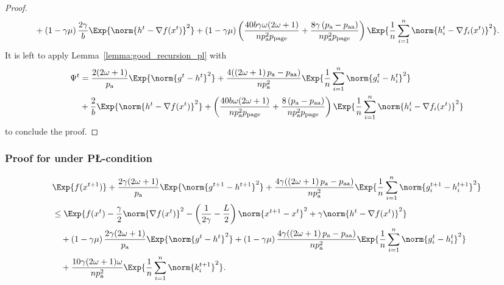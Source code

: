 \documentclass{article}
\newcommand{\algorithmname}{DASHA-PP}
\newcommand*{\probavailable}{\ensuremath{p_{\textnormal{a}}}}
\newcommand*{\probpairaa}{\ensuremath{p_{\textnormal{aa}}}}
\newcommand*{\probpage}{\ensuremath{p_{\text{page}}}}
\begin{document}
\begin{proof}
\begin{align*}
      &\quad + \left(1 - \gamma \mu\right)\frac{2\gamma}{b}\Exp{\norm{h^{t} - \nabla f(x^{t})}^2} + \left(1 - \gamma \mu\right)\left(\frac{40 b \gamma \omega (2 \omega + 1)}{n \probavailable^2 \probpage} + \frac{8 \gamma \left(\probavailable - \probpairaa\right)}{n \probavailable^2 \probpage}\right)\Exp{\frac{1}{n}\sum_{i=1}^n\norm{h^{t}_i - \nabla f_i(x^{t})}^2}.
    \end{align*}
    It is left to apply Lemma~\ref{lemma:good_recursion_pl} with 
    \begin{align*}
      \Psi^t &= \frac{2 (2 \omega + 1)}{\probavailable} \Exp{\norm{g^{t} - h^{t}}^2} + \frac{4 (\left(2 \omega + 1\right)\probavailable - \probpairaa)}{n \probavailable^2} \Exp{\frac{1}{n}\sum_{i=1}^n\norm{g^{t}_i - h^{t}_i}^2} \\
      &+ \frac{2}{b}\Exp{\norm{h^{t} - \nabla f(x^{t})}^2} + \left(\frac{40 b \omega (2 \omega + 1)}{n \probavailable^2 \probpage} + \frac{8 \left(\probavailable - \probpairaa\right)}{n \probavailable^2 \probpage}\right)\Exp{\frac{1}{n}\sum_{i=1}^n\norm{h^{t}_i - \nabla f_i(x^{t})}^2}
    \end{align*}
    to conclude the proof.
  \end{proof}

  \subsubsection{Proof for \algname{\algorithmname-MVR} under P\L-condition}

  \CONVERGENCEPLSTOCHASTIC*

  \begin{align*}
    &\Exp{f(x^{t + 1})} + \frac{2\gamma (2\omega + 1)}{\probavailable} \Exp{\norm{g^{t+1} - h^{t+1}}^2} + \frac{4 \gamma (\left(2 \omega + 1\right)\probavailable - \probpairaa)}{n \probavailable^2} \Exp{\frac{1}{n}\sum_{i=1}^n\norm{g^{t+1}_i - h^{t+1}_i}^2}\\
    &\leq \Exp{f(x^t) - \frac{\gamma}{2}\norm{\nabla f(x^t)}^2 - \left(\frac{1}{2\gamma} - \frac{L}{2}\right)
    \norm{x^{t+1} - x^t}^2 + \gamma \norm{h^{t} - \nabla f(x^t)}^2}\nonumber\\
    &\quad + \left(1 - \gamma \mu\right)\frac{2\gamma(2\omega + 1)}{\probavailable}\Exp{\norm{g^{t} - h^t}^2} + \left(1 - \gamma \mu\right)\frac{4 \gamma (\left(2 \omega + 1\right)\probavailable - \probpairaa)}{n \probavailable^2}\Exp{\frac{1}{n} \sum_{i=1}^n\norm{g^t_i - h^{t}_i}^2}\nonumber\\
    &\quad + \frac{10 \gamma (2 \omega + 1)\omega}{n \probavailable^2}\Exp{\frac{1}{n} \sum_{i=1}^n\norm{k^{t+1}_i}^2}.
  \end{align*}
\end{document}
